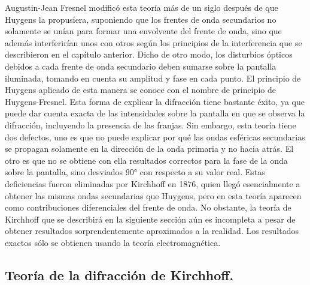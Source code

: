 \documentclass[14pt]{extarticle}
\begin{document}
Augustin-Jean Fresnel modificó esta teoría más de un siglo después de que Huygens la propusiera, suponiendo que los frentes de onda secundarios no solamente se unían para formar una envolvente del frente de onda, sino que además interferirían unos con otros según los principios de la interferencia que se describieron en el capítulo anterior. Dicho de otro modo, los disturbios ópticos debidos a cada frente de onda secundario deben sumarse sobre la pantalla iluminada, tomando en cuenta su amplitud y fase en cada punto. El principio de Huygens aplicado de esta manera se conoce con el nombre de principio de Huygens-Fresnel. Esta forma de explicar la difracción tiene bastante éxito, ya que puede dar cuenta exacta de las intensidades sobre la pantalla en que se observa la difracción, incluyendo la presencia de las franjas. Sin embargo, esta teoría tiene dos defectos, uno es que no puede explicar por qué las ondas esféricas secundarias se propagan solamente en la dirección de la onda primaria y no hacia atrás. El otro es que no se obtiene con ella resultados correctos para la fase de la onda sobre la pantalla, sino desviados $\ang{90}$ con respecto a su valor real. Estas deficiencias fueron eliminadas por Kirchhoff en 1876, quien llegó esencialmente a obtener las mismas ondas secundarias que Huygens, pero en esta teoría aparecen como contribuciones diferenciales del frente de onda. No obstante, la teoría de Kirchhoff que se describirá en la siguiente sección aún es incompleta a pesar de obtener resultados sorprendentemente aproximados a la realidad. Los resultados exactos sólo se obtienen usando la teoría electromagnética.

\subsection{Teoría de la difracción de Kirchhoff.}
 
\end{document}
